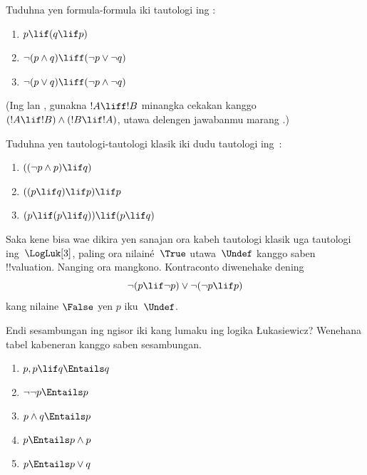 \documentclass[../../../include/open-logic-section]{subfiles}
\begin{document}
\begin{prob}
  Tuduhna yen formula-formula iki tautologi ing \LogLuk[3]:
  \begin{enumerate}
    \item $p \lif (q \lif p)$
    \item\label{mvl:thr:luk:prob:luk-taut-2} $\lnot(p \land q) \liff (\lnot p \lor \lnot q)$
    \item\label{mvl:thr:luk:prob:luk-taut-3} $\lnot(p \lor q) \liff (\lnot p \land \lnot q)$
  \end{enumerate}
  (Ing  lan
  , gunakna $!A \liff !B$
  minangka cekakan kanggo $(!A \lif !B) \land (!B \lif !A)$,
  utawa delengen jawabanmu marang
  .)
\end{prob}

\begin{prob}
  Tuduhna yen tautologi-tautologi klasik iki dudu tautologi ing~\LogLuk[3]:
  \begin{enumerate}
    \item $((\lnot p \land p) \lif q)$
    \item $((p \lif q) \lif p) \lif p$
    \item $(p \lif (p \lif q)) \lif (p \lif q)$
  \end{enumerate}
\end{prob}

Saka kene bisa wae dikira yen sanajan ora kabeh tautologi
klasik uga tautologi ing~$\LogLuk[3]$, paling ora
nilainé~$\True$ utawa~$\Undef$ kanggo saben
!!{valuation}. Nanging ora mangkono. Kontraconto diwenehake dening
\[
  \lnot(p \lif \lnot p) \lor \lnot(\lnot p \lif p)
\]
kang nilaine $\False$ yen $p$ iku~$\Undef$.

\begin{prob}
  Endi sesambungan ing ngisor iki kang lumaku ing logika \L ukasiewicz?
  Wenehana tabel kabeneran kanggo saben sesambungan.
  \begin{enumerate}
    \item $p, p \lif q \Entails q$
    \item $\lnot\lnot p \Entails p$
    \item $p \land q \Entails p$
    \item $p \Entails p \land p$
    \item $p \Entails p \lor q$
  \end{enumerate}
\end{prob}
\end{document}
